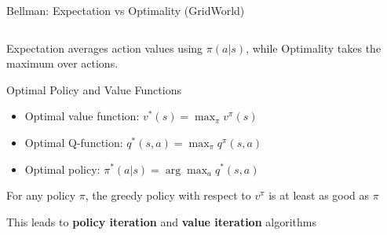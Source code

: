 \documentclass[aspectratio=169,10pt]{beamer}
\begin{document}
\begin{frame}{Bellman: Expectation vs Optimality (GridWorld)}
\begin{columns}[T,onlytextwidth]
\begin{column}{0.49\textwidth}

\end{column}
\end{columns}

\medskip
\centering
\small Expectation averages action values using $\pi(a|s)$, while Optimality takes the maximum over actions.
\end{frame}

\begin{frame}{Optimal Policy and Value Functions}
\begin{itemize}
    \item Optimal value function: $v^*(s) = \max_{\pi} v^{\pi}(s)$
    \item Optimal Q-function: $q^*(s,a) = \max_{\pi} q^{\pi}(s,a)$
    \item Optimal policy: $\pi^*(a|s) = \arg\max_a q^*(s,a)$
\end{itemize}

\begin{theorem}
For any policy $\pi$, the greedy policy with respect to $v^{\pi}$ is at least as good as $\pi$
\end{theorem}

This leads to \textbf{policy iteration} and \textbf{value iteration} algorithms
\end{frame}
\end{document}
